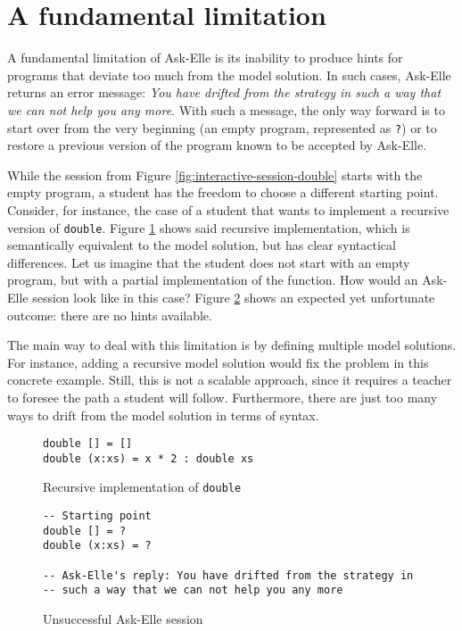 \section{A fundamental limitation}
\label{sec:intro-fundamental-limitation}

A fundamental limitation of Ask-Elle is its inability to produce hints for programs that deviate too much from the model solution. In such cases, Ask-Elle returns an error message: \emph{You have drifted from the strategy in such a way that we can not help you any more}. With such a message, the only way forward is to start over from the very beginning (an empty program, represented as \texttt{?}) or to restore a previous version of the program known to be accepted by Ask-Elle.

While the session from Figure \ref{fig:interactive-session-double} starts with the empty program, a student has the freedom to choose a different starting point. Consider, for instance, the case of a student that wants to implement a recursive version of \texttt{double}. Figure \ref{fig:limitations-recursive-double} shows said recursive implementation, which is semantically equivalent to the model solution, but has clear syntactical differences. Let us imagine that the student does not start with an empty program, but with a partial implementation of the function. How would an Ask-Elle session look like in this case? Figure \ref{fig:limitations-askelle-example-session} shows an expected yet unfortunate outcome: there are no hints available.

The main way to deal with this limitation is by defining multiple model solutions. For instance, adding a recursive model solution would fix the problem in this concrete example. Still, this is not a scalable approach, since it requires a teacher to foresee the path a student will follow. Furthermore, there are just too many ways to drift from the model solution in terms of syntax.

\begin{figure}
\begin{verbatim}
double [] = []
double (x:xs) = x * 2 : double xs
\end{verbatim}
\caption{Recursive implementation of \texttt{double}}
\label{fig:limitations-recursive-double}
\end{figure}

\begin{figure}
\begin{verbatim}
-- Starting point
double [] = ?
double (x:xs) = ?

-- Ask-Elle's reply: You have drifted from the strategy in
-- such a way that we can not help you any more
\end{verbatim}
\caption{Unsuccessful Ask-Elle session}
\label{fig:limitations-askelle-example-session}
\end{figure}

